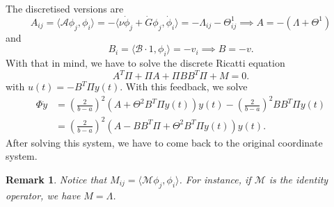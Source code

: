 \documentclass[12pt]{article}
\newcommand{\A}{\mathcal{A}}
\newcommand{\B}{\mathcal{B}}
\newcommand{\inner}[2]{\langle{} #1, #2 \rangle{}}
\newtheorem{remark}{Remark}[subsection]
\theoremstyle{definition}
\begin{document}
The discretised versions are 
\[
A_{ij} = \inner{\A \phi_j}{\phi_i} = -\inner{\nu \dot \phi_j + \dot G \phi_j}{\dot \phi_i} = -\Lambda_{ij} - \Theta^1_{ij} \implies A = -(\Lambda + \Theta^1) 
\]
and 
\[
B_{i} = \inner{\B\cdot 1}{\phi_i} = -v_i \implies B = -v.
\]
With that in mind, we have to solve the discrete Ricatti equation
\[
A^T\Pi + \Pi A + \Pi B B^T \Pi + M = 0.
\]
with $u(t) = -B^T\Pi y(t)$. 
With this feedback, we solve
\[
\begin{split}
    \Phi \dot{y} &= {\left(\frac{2}{b-a}\right)}^2(A + \Theta^2B^T\Pi y(t) )y(t) - {\left(\frac{2}{b-a}\right)}^2BB^T\Pi y(t) \\ 
    &= {\left(\frac{2}{b-a}\right)}^2(A - BB^T\Pi  + \Theta^2B^T\Pi y(t))y(t).
\end{split}
\]
After solving this system, we have to come back to the original coordinate system.

\begin{remark}
    Notice that $M_{ij} = \inner{\mathcal{M} \phi_j}{\phi_i}$.
    For instance, if $\mathcal{M}$ is the identity operator, we have $M = \Lambda$.
\end{remark}




\end{document}
